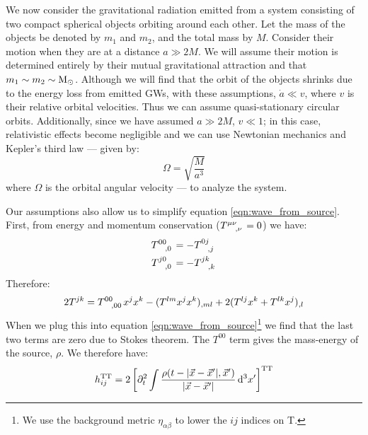 We now consider the gravitational radiation emitted from a system consisting of two compact spherical objects orbiting around each other. Let the mass of the objects be denoted by $m_1$ and $m_2$, and the total mass by $M$. Consider their motion when they are at a distance $a \gg 2M$. We will assume their motion is determined entirely by their mutual gravitational attraction and that $m_1 \sim m_2 \sim \mathrm{M_\odot}$. Although we will find that the orbit of the objects shrinks due to the energy loss from emitted \acp{GW}, with these assumptions, $\dot{a} \ll v$, where $v$ is their relative orbital velocities. Thus we can assume quasi-stationary circular orbits. Additionally, since we have assumed $a \gg 2M$, $v \ll 1$; in this case, relativistic effects become negligible and we can use Newtonian mechanics and Kepler's third law --- given by: 
\begin{equation}
\label{eqn:keplers_thirdlaw}
\Omega = \sqrt{\frac{M}{a^3}}
\end{equation}
where $\Omega$ is the orbital angular velocity --- to analyze the system.

Our assumptions also allow us to simplify equation \ref{eqn:wave_from_source}. First, from energy and momentum conservation ($T\indices{^{\mu\nu}_{,\nu}} = 0$) we have:
\begin{align*}
T\indices{^{00}_{,0}} &= -T\indices{^{0j}_{,j}} \\
T\indices{^{j0}_{,0}} &= -T\indices{^{jk}_{,k}}
\end{align*}
Therefore:
\begin{equation*}
2T^{jk} = T\indices{^{00}_{,00}}x^jx^k - (T^{lm}x^jx^k)_{,ml} + 2(T^{lj}x^k + T^{lk}x^j)_{,l}
\end{equation*}
When we plug this into equation \ref{eqn:wave_from_source}\footnote{We use the background metric $\eta_{\alpha\beta}$ to lower the $ij$ indices on T.} we find that the last two terms are zero due to Stokes theorem. The $T^{00}$ term gives the mass-energy of the source, $\rho$. We therefore have:
\begin{equation}
\label{eqn:source_rho}
h^\TT_{ij} = 2 \left[ \partial_t^2 \int \frac{\rho(t - |\vec{x}-\vec{x}'|, \vec{x}')}{|\vec{x} - \vec{x}'|} \d^3x'\right]^\TT
\end{equation}


